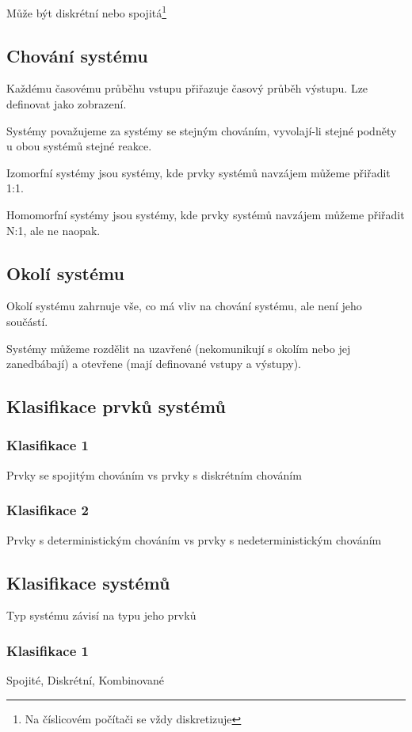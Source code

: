 \documentclass[11pt]{article}
\begin{document}
Může být diskrétní nebo spojitá\footnote{Na číslicovém počítači se vždy diskretizuje}

\subsection{Chování systému}
\label{sec:org7d926d1}
Každému časovému průběhu vstupu přiřazuje časový průběh výstupu. Lze definovat
jako zobrazení.

Systémy považujeme za systémy se stejným chováním, vyvolají-li stejné podněty u
obou systémů stejné reakce.

Izomorfní systémy jsou systémy, kde prvky systémů navzájem můžeme přiřadit 1:1.

Homomorfní systémy jsou systémy, kde prvky systémů navzájem můžeme přiřadit N:1,
ale ne naopak.

\subsection{Okolí systému}
\label{sec:orgabb5218}
Okolí systému zahrnuje vše, co má vliv na chování systému, ale není jeho
součástí.

Systémy můžeme rozdělit na uzavřené (nekomunikují s okolím nebo jej zanedbábají)
a otevřene (mají definované vstupy a výstupy).

\subsection{Klasifikace prvků systémů}
\label{sec:org926e6a0}
\subsubsection{Klasifikace 1}
\label{sec:orgbffac87}
Prvky se spojitým chováním vs prvky s diskrétním chováním
\subsubsection{Klasifikace 2}
\label{sec:org991a254}
Prvky s deterministickým chováním vs prvky s nedeterministickým chováním

\subsection{Klasifikace systémů}
\label{sec:orgac56ac7}
Typ systému závisí na typu jeho prvků
\subsubsection{Klasifikace 1}
\label{sec:org50f6995}
Spojité, Diskrétní, Kombinované
\end{document}
